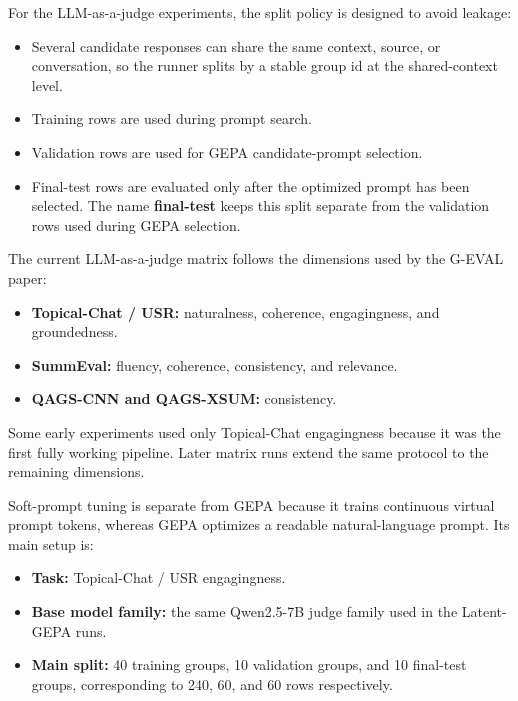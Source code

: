 \documentclass[12pt,a4paper,twoside,openright]{book}
\begin{document}
For the LLM-as-a-judge experiments, the split policy is designed to avoid leakage:
\begin{itemize}
    \item Several candidate responses can share the same context, source, or
    conversation, so the runner splits by a stable group id at the shared-context
    level.
    \item Training rows are used during prompt search.
    \item Validation rows are used for GEPA candidate-prompt selection.
    \item Final-test rows are evaluated only after the optimized prompt has
    been selected. The name \textbf{final-test} keeps this split separate from
    the validation rows used during GEPA selection.
\end{itemize}

The current LLM-as-a-judge matrix follows the dimensions used by the G-EVAL
paper:
\begin{itemize}
    \item \textbf{Topical-Chat / USR:} naturalness, coherence, engagingness, and
    groundedness.
    \item \textbf{SummEval:} fluency, coherence, consistency, and relevance.
    \item \textbf{QAGS-CNN and QAGS-XSUM:} consistency.
\end{itemize}
Some early experiments used only Topical-Chat engagingness because it was the
first fully working pipeline. Later matrix runs extend the same protocol to the
remaining dimensions.

Soft-prompt tuning is separate from GEPA because it trains continuous virtual
prompt tokens, whereas GEPA optimizes a readable natural-language prompt. Its
main setup is:
\begin{itemize}
    \item \textbf{Task:} Topical-Chat / USR engagingness.
    \item \textbf{Base model family:} the same Qwen2.5-7B judge family used in
    the Latent-GEPA runs.
    \item \textbf{Main split:} 40 training groups, 10 validation groups, and 10
    final-test groups, corresponding to 240, 60, and 60 rows respectively.
\end{itemize}
\end{document}
